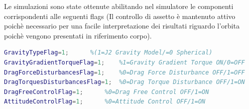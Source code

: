 Le simulazioni sono state ottenute abilitando nel simulatore le componenti
corrispondenti alle seguenti flags (Il controllo di assetto è mantenuto attivo
poichè necessario per una facile interpretazione dei risultati riguardo
l'orbita poichè vengono presentati in riferimento corpo).

\begin{lstlisting}[language=matlab,breaklines=true]
GravityTypeFlag=1;		%(1=J2 Gravity Model/=0 Spherical)
GravityGradientTorqueFlag=1;	%1=Gravity Gradient Torque ON/0=OFF 
DragForceDisturbancesFlag=1;	%0=Drag Force Disturbance OFF/1=OFF
DragTorquesDisturbancesFlag=1;	%0=Drag Torque Disturbance OFF/1=ON
DragFreeControlFlag=1;		%0=Drag Free Control OFF/1=ON
AttitudeControlFlag=1;		%0=Attitude Control OFF/1=ON
\end{lstlisting}

